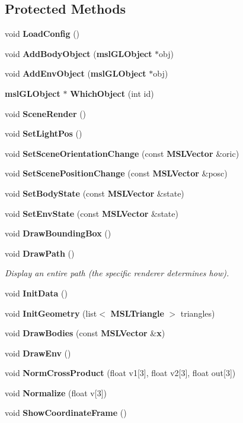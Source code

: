 \subsection*{Protected Methods}
\begin{CompactItemize}
\item 
void {\bf Load\-Config} ()
\item 
void {\bf Add\-Body\-Object} ({\bf msl\-GLObject} $\ast$obj)
\item 
void {\bf Add\-Env\-Object} ({\bf msl\-GLObject} $\ast$obj)
\item 
{\bf msl\-GLObject} $\ast$ {\bf Which\-Object} (int id)
\item 
void {\bf Scene\-Render} ()
\item 
void {\bf Set\-Light\-Pos} ()
\item 
void {\bf Set\-Scene\-Orientation\-Change} (const {\bf MSLVector} \&oric)
\item 
void {\bf Set\-Scene\-Position\-Change} (const {\bf MSLVector} \&posc)
\item 
void {\bf Set\-Body\-State} (const {\bf MSLVector} \&state)
\item 
void {\bf Set\-Env\-State} (const {\bf MSLVector} \&state)
\item 
void {\bf Draw\-Bounding\-Box} ()
\item 
void {\bf Draw\-Path} ()
\begin{CompactList}\small\item\em Display an entire path (the specific renderer determines how).\item\end{CompactList}\item 
void {\bf Init\-Data} ()
\item 
void {\bf Init\-Geometry} (list$<$ {\bf MSLTriangle} $>$ triangles)
\item 
void {\bf Draw\-Bodies} (const {\bf MSLVector} \&{\bf x})
\item 
void {\bf Draw\-Env} ()
\item 
void {\bf Norm\-Cross\-Product} (float v1[3], float v2[3], float out[3])
\item 
void {\bf Normalize} (float v[3])
\item 
void {\bf Show\-Coordinate\-Frame} ()
\end{CompactItemize}
